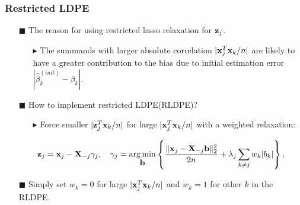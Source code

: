 

\begin{frame}
\frametitle{Restricted LDPE}
\begin{itemize}
\item[$\blacksquare$] The reason for using restricted lasso relaxation for $\mbox{\bf z}_j$.

  \begin{itemize}
  \item[$\blacktriangleright$]The summands with larger absolute correlation $|\mbox{\bf x}_j^T\mbox{\bf x}_k/n|$ are likely to have a greater contribution to the bias due to initial estimation error $|\hat{\beta}^{(init)}_k-\beta_k|$.
  \end{itemize}
\item[$\blacksquare$] How to implement restricted LDPE(RLDPE)?
  \begin{itemize}
  \item[$\blacktriangleright$] Force smaller $|\mbox{\bf z}_j^T\mbox{\bf x}_k/n|$ for large $|\mbox{\bf x}_j^T\mbox{\bf x}_k/n|$ with a weighted relaxation:
  \end{itemize}
  \begin{scriptsize}
  \begin{equation}
  \mbox{\bf z}_j = \mbox{\bf x}_j - \mbox{\bf X}_{-j}\gamma_j,\quad \gamma_j = \mathop{\arg\min}_{\mbox{\bf b}}\left\{\frac{\|\mbox{\bf x}_j-\mbox{\bf X}_{-j}\mbox{\bf b}\|_2^2}{2n} + \lambda_j\sum_{k\neq j}w_k|b_k|\right\},
  \end{equation}
  \end{scriptsize}

\item[$\blacksquare$] Simply set $w_k=0$ for large $|\mbox{\bf x}_j^T\mbox{\bf x}_k/n|$ and $w_k=1$ for other $k$ in the RLDPE.

\end{itemize}
\end{frame}


